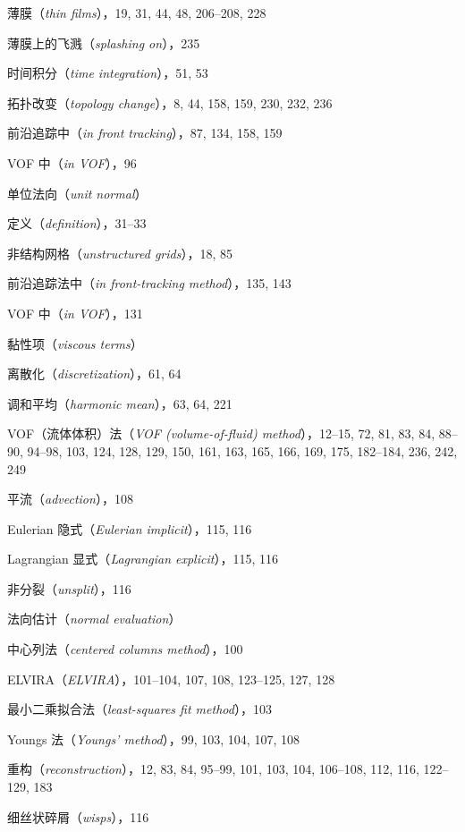 \documentclass[11pt,a4paper,openany,fontset=none]{ctexbook}
\begin{document}
薄膜（\textit{thin films}），19, 31, 44, 48, 206--208, 228\par
\quad 薄膜上的飞溅（\textit{splashing on}），235\par
时间积分（\textit{time integration}），51, 53\par
拓扑改变（\textit{topology change}），8, 44, 158, 159, 230, 232, 236\par
\quad 前沿追踪中（\textit{in front tracking}），87, 134, 158, 159\par
\quad VOF 中（\textit{in VOF}），96\par
单位法向（\textit{unit normal}）\par
\quad 定义（\textit{definition}），31--33\par
非结构网格（\textit{unstructured grids}），18, 85\par
\quad 前沿追踪法中（\textit{in front-tracking method}），135, 143\par
\quad VOF 中（\textit{in VOF}），131\par
黏性项（\textit{viscous terms}）\par
\quad 离散化（\textit{discretization}），61, 64\par
\quad 调和平均（\textit{harmonic mean}），63, 64, 221\par
VOF（流体体积）法（\textit{VOF (volume-of-fluid) method}），12--15, 72, 81, 83, 84, 88--90, 94--98, 103, 124, 128, 129, 150, 161, 163, 165, 166, 169, 175, 182--184, 236, 242, 249\par
\quad 平流（\textit{advection}），108\par
\quad Eulerian 隐式（\textit{Eulerian implicit}），115, 116\par
\quad Lagrangian 显式（\textit{Lagrangian explicit}），115, 116\par
\quad 非分裂（\textit{unsplit}），116\par
\quad 法向估计（\textit{normal evaluation}）\par
\qquad 中心列法（\textit{centered columns method}），100\par
\qquad ELVIRA（\textit{ELVIRA}），101--104, 107, 108, 123--125, 127, 128\par
\qquad 最小二乘拟合法（\textit{least-squares fit method}），103\par
\qquad Youngs 法（\textit{Youngs' method}），99, 103, 104, 107, 108\par
\quad 重构（\textit{reconstruction}），12, 83, 84, 95--99, 101, 103, 104, 106--108, 112, 116, 122--129, 183\par
\quad 细丝状碎屑（\textit{wisps}），116\par
\end{document}
